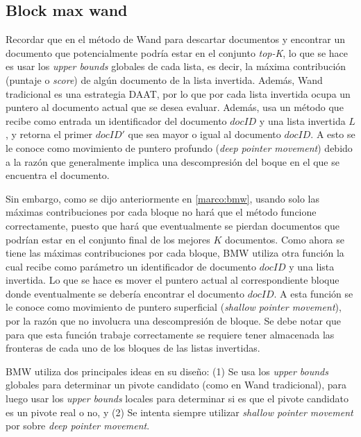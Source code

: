 \subsection{Block max wand}
Recordar que en el método de Wand para descartar documentos y encontrar un documento que potencialmente podría estar en el conjunto \textit{top-K}, lo que se hace es usar los \textit{upper bounds} globales de cada lista, es decir, la máxima contribución (puntaje o \textit{score}) de algún documento de la lista invertida. Además, Wand tradicional es una estrategia DAAT, por lo que por cada lista invertida ocupa un puntero al documento actual que se desea evaluar. Además, usa un método que recibe como entrada un identificador del documento $docID$ y una lista invertida $L$, y retorna el primer $docID'$ que sea mayor o igual al documento $docID$. A esto se le conoce como movimiento de puntero profundo (\textit{deep pointer movement}) debido a la razón que generalmente implica una descompresión del boque en el que se encuentra el documento.

Sin embargo, como se dijo anteriormente en \ref{marco:bmw}, usando solo las máximas contribuciones por cada bloque no hará que el método funcione correctamente, puesto que hará que eventualmente se pierdan documentos que podrían estar en el conjunto final de los mejores $K$ documentos. Como ahora se tiene las máximas contribuciones por cada bloque, BMW utiliza otra función la cual recibe como parámetro un identificador de documento $docID$ y una lista invertida. Lo que se hace es mover el puntero actual al correspondiente bloque donde eventualmente se debería encontrar el documento $docID$. A esta función se le conoce como movimiento de puntero superficial (\textit{shallow pointer movement}), por la razón que no involucra una descompresión de bloque. Se debe notar que para que esta función trabaje correctamente se requiere tener almacenada las fronteras de cada uno de los bloques de las listas invertidas.

BMW utiliza dos principales ideas en su diseño: (1) Se usa los \textit{upper bounds} globales para determinar un pivote candidato (como en Wand tradicional), para luego usar los \textit{upper bounds} locales para determinar si es que el pivote candidato es un pivote real o no, y (2) Se intenta siempre utilizar \textit{shallow pointer movement} por sobre \textit{deep pointer movement}.

